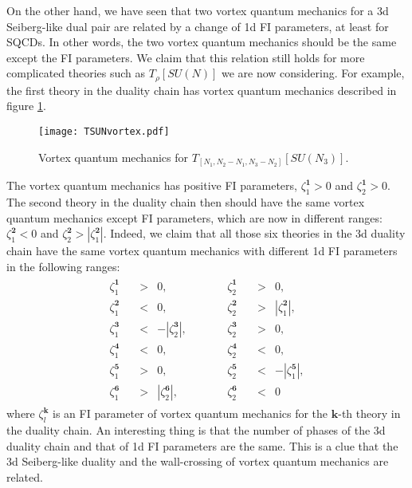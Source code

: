 \documentclass[a4paper,11pt]{article}
\begin{document}
On the other hand, we have seen that two vortex quantum mechanics for a 3d Seiberg-like dual pair are related by a change of 1d FI parameters, at least for SQCDs. In other words, the two vortex quantum mechanics should be the same except the FI parameters. We claim that this relation still holds for more complicated theories such as $T_\rho [SU(N)]$ we are now considering. For example, the first theory in the duality chain has vortex quantum mechanics described in figure \ref{fig:T[SU(N)] vortex}.
%
\begin{figure}[tbp]
\centering %
\texttt{[image: TSUNvortex.pdf]}
\caption{\label{fig:T[SU(N)] vortex} Vortex quantum mechanics for $T_{[N_1,N_2-N_1,N_3-N_2]} [SU(N_3)]$.}
\end{figure}
%
The vortex quantum mechanics has positive FI parameters, $\zeta^{\mathbf 1}_1 > 0$ and $\zeta^{\mathbf 1}_2 > 0$. The second theory in the duality chain then should have the same vortex quantum mechanics except FI parameters, which are now in different ranges: $\zeta^{\mathbf 2}_1 < 0$ and $\zeta^{\mathbf 2}_2 > |\zeta^{\mathbf 2}_1|$. Indeed, we claim that all those six theories in the 3d duality chain have the same vortex quantum mechanics with different 1d FI parameters in the following ranges:
\begin{align}
\label{eq:T[SU(N)] FI}
\begin{array}{ccccccc}
\zeta^{\mathbf 1}_1 \quad &>& 0, &\qquad& \zeta^{\mathbf 1}_2 \quad &>& 0, \\
\zeta^{\mathbf 2}_1 \quad &<& 0, &\qquad& \zeta^{\mathbf 2}_2 \quad &>& |\zeta^{\mathbf 2}_1|, \\
\zeta^{\mathbf 3}_1 \quad &<& -|\zeta^{\mathbf 3}_2|, &\qquad& \zeta^{\mathbf 3}_2 \quad &>& 0, \\
\zeta^{\mathbf 4}_1 \quad &<& 0, &\qquad& \zeta^{\mathbf 4}_2 \quad &<& 0, \\
\zeta^{\mathbf 5}_1 \quad &>& 0, &\qquad& \zeta^{\mathbf 5}_2 \quad &<& -|\zeta^{\mathbf 5}_1|, \\
\zeta^{\mathbf 6}_1 \quad &>& |\zeta^{\mathbf 6}_2|, &\qquad& \zeta^{\mathbf 6}_2 \quad &<& 0
\end{array}
\end{align}
where $\zeta^{\mathbf k}_l$ is an FI parameter of vortex quantum mechanics for the $\mathbf k$-th theory in the duality chain. An interesting thing is that the number of phases of the 3d duality chain and that of 1d FI parameters are the same. This is a clue that the 3d Seiberg-like duality and the wall-crossing of vortex quantum mechanics are related.
\\
\end{document}
